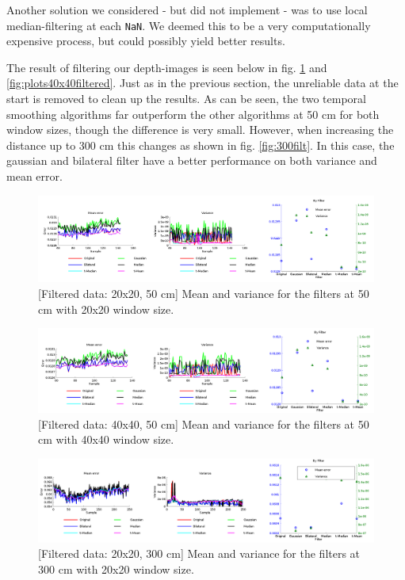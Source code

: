 \documentclass[11pt]{article}
\begin{document}
Another solution we considered - but did not implement - was to use local
median-filtering at each \texttt{NaN}. We deemed this to be a very
computationally expensive process, but could possibly yield better results. \par

The result of filtering our depth-images is seen below in
fig. \ref{fig:plots20x20filtered} and \vref{fig:plots40x40filtered}. Just as in
the previous section, the unreliable data at the start is removed to clean up
the results. As can be seen, the two temporal smoothing algorithms far
outperform the other algorithms at 50 cm for both window sizes, though the
difference is very small. However, when increasing the distance up to 300 cm
this changes as shown in fig. \vref{fig:300filt}. In this case, the gaussian 
and bilateral filter have a better performance on both variance and mean error. 

\begin{figure}[ht]
  \centering
  \includegraphics[width=1\textwidth]{figures/plot20x20filtered.png}
  [Filtered data: 20x20, 50 cm]{\label{fig:plots20x20filtered}
    Mean and variance for the filters at 50 cm with 20x20 window size.}
\end{figure}
\begin{figure}[ht]
  \begin{center}
    \includegraphics[width=1\textwidth]{figures/plot40x40filtered.png}
    [Filtered data: 40x40, 50
    cm]{\label{fig:plots40x40filtered} Mean and variance for the filters at 50
      cm with 40x40 window size.}
  \end{center}
\end{figure}

\begin{figure}[ht]
  \begin{center}
    \includegraphics[width=1\textwidth]{figures/filtered300cm.png}
    [Filtered data: 20x20, 300 cm]{\label{fig:300filt} Mean
      and variance for the filters at 300 cm with 20x20 window size.}
  \end{center}
\end{figure}
\end{document}
